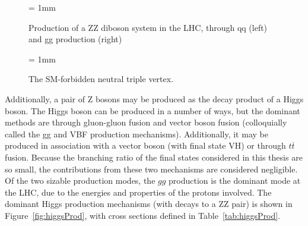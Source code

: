 \begin{figure}[h]
\centering
\unitlength = 1mm
\caption[Standard Model ZZ production]{Production of a ZZ diboson system in the LHC, through qq (left) and gg
production (right)}
\label{fig:zzprod}
\end{figure}

\begin{figure}[h]
\centering
\unitlength = 1mm
\caption[The SM-forbidden ZZZ (or ZZ$\gamma$ coupling.]{The SM-forbidden neutral triple vertex.}
\label{fig:zzatgc}
\end{figure}


Additionally, a pair of Z bosons may be produced as the decay product of a Higgs
boson. The Higgs boson can be produced in a number of ways, but the dominant
methods are through gluon-gluon fusion and vector boson fusion (colloquially
called the gg and VBF production mechanisms). Additionally, it may be produced
in association with a vector boson (with final state VH) or through $t\overline
t$ fusion. Because the branching ratio of the final states considered in this
thesis are so small, the contributions from these two mechanisms are considered
negligible. Of the two sizable production modes, the $gg$ production
is the dominant mode at the LHC, due to the energies and properties of the
protons involved. The dominant Higgs production mechanisms (with decays to a ZZ
pair) is shown in Figure~\ref{fig:higgsProd}, with cross sections defined in
Table~\ref{tab:higgsProd}. 

